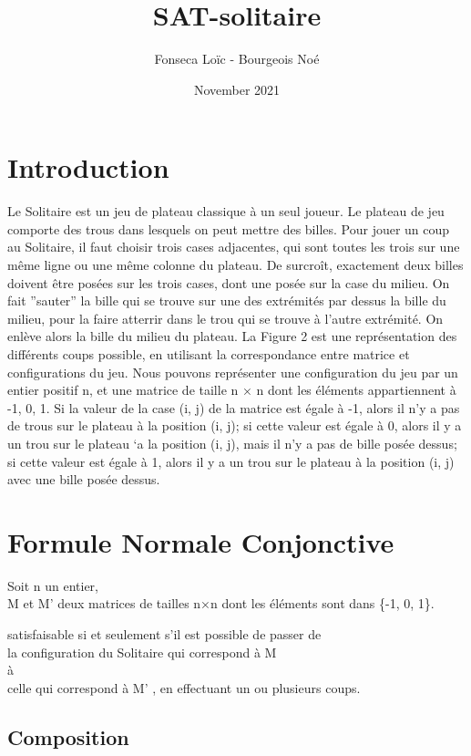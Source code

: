 \documentclass[utf8]{article}
\title{SAT-solitaire}
\author{Fonseca Loïc - Bourgeois Noé}
\date{November 2021}
\begin{document}
\maketitle
\tableofcontents

\newpage


\section{Introduction}
Le Solitaire est un jeu de plateau classique à un seul joueur. 
Le plateau de jeu comporte des trous dans lesquels on peut mettre des billes. 
Pour jouer un coup au Solitaire, il faut choisir trois cases adjacentes, qui sont
toutes les trois sur une même ligne ou une même colonne du plateau. De surcroît,
exactement deux billes doivent être posées sur les trois cases, dont une posée sur
la case du milieu. On fait ”sauter” la bille qui se trouve sur une des extrémités
par dessus la bille du milieu, pour la faire atterrir dans le trou qui se trouve à
l’autre extrémité. On enlève alors la bille du milieu du plateau. La Figure 2 est
une représentation des différents coups possible, en utilisant la correspondance
entre matrice et configurations du jeu. Nous pouvons représenter une configuration du jeu par un entier positif n, et
une matrice de taille n × n dont les éléments appartiennent à {-1, 0, 1}. Si la
valeur de la case (i, j) de la matrice est égale à -1, alors il n’y a pas de trous
sur le plateau à la position (i, j); si cette valeur est égale à 0, alors il y a un
trou sur le plateau `a la position (i, j), mais il n’y a pas de bille posée dessus; 
si cette valeur est égale à 1, alors il y a un trou sur le plateau à la position (i, j) avec une bille posée dessus.


\section{Formule Normale Conjonctive}
Soit n un entier, \\
M et M' deux matrices de tailles n×n 
dont les éléments sont dans \{-1, 0, 1\}. 


satisfaisable si et seulement s’il est possible de passer de
\\la configuration du Solitaire
qui correspond à M 
\\à 
\\celle qui correspond à M'
, en effectuant un ou
plusieurs coups. 
\subsection{Composition}
\end{document}
